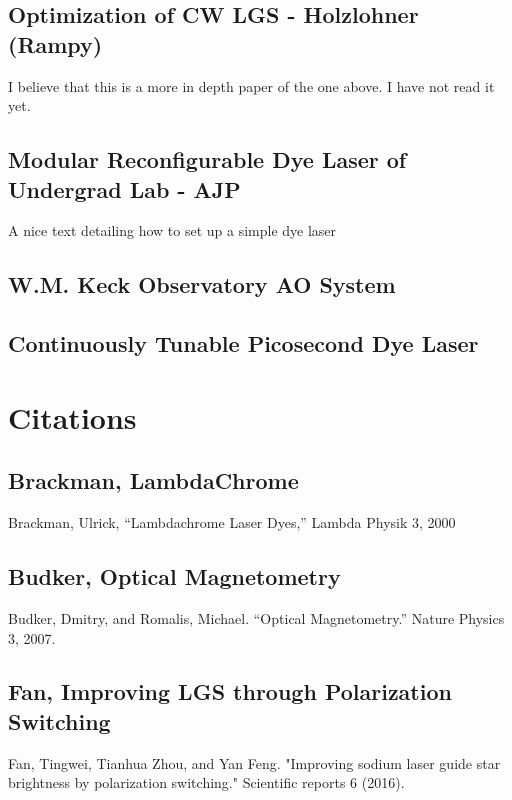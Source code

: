 \documentclass{article}
\begin{document}
\subsection{Optimization of CW LGS - Holzlohner (Rampy)}
I believe that this is a more in depth paper of the one above. I have not read it yet.
\pagebreak


\pagebreak

\subsection{Modular Reconfigurable Dye Laser of Undergrad Lab - AJP}
A nice text detailing how to set up a simple dye laser
\pagebreak


\pagebreak
\subsection{W.M. Keck Observatory AO System}

\pagebreak


\pagebreak

\subsection{Continuously Tunable Picosecond Dye Laser}
\pagebreak

\pagebreak


\section{Citations}
\subsection{Brackman, LambdaChrome}
Brackman, Ulrick, “Lambdachrome Laser Dyes,” Lambda Physik 3, 2000
\subsection{Budker, Optical Magnetometry}
Budker, Dmitry, and Romalis, Michael. “Optical Magnetometry.” Nature Physics 3, 2007.
\subsection{Fan, Improving LGS through Polarization Switching}
Fan, Tingwei, Tianhua Zhou, and Yan Feng. "Improving sodium laser guide star brightness by polarization switching." Scientific reports 6 (2016).
\end{document}
